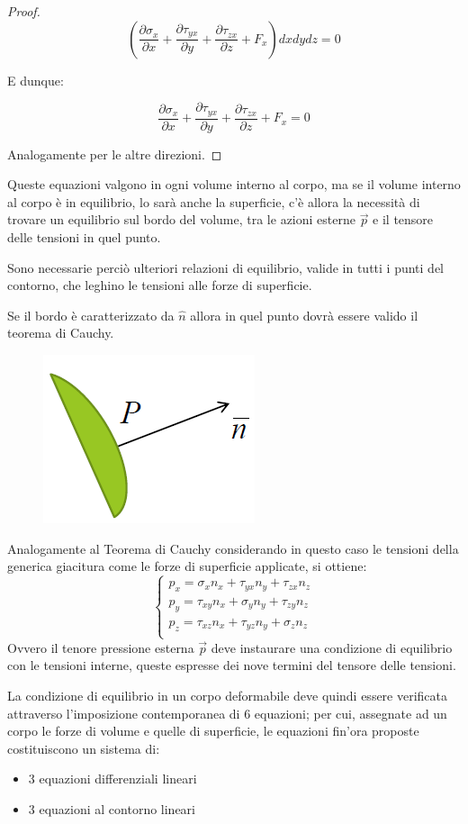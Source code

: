\documentclass{article}
\begin{document}
\begin{adjustwidth}{2in}{}
\begin{proof}
	\[
	\left( \frac{\partial \sigma_x}{\partial x} +  \frac{\partial \tau_{yx}}{\partial y} + \frac{\partial \tau_{zx}}{\partial z} + F_x \right) dxdydz = 0 
	\]
	
	E dunque: 
	
	\[
	\frac{\partial \sigma_x}{\partial x} +  \frac{\partial \tau_{yx}}{\partial y} + \frac{\partial \tau_{zx}}{\partial z} + F_x = 0	
	\]
	
	Analogamente per le altre direzioni.
	
	\end{proof}

	Queste equazioni valgono in ogni volume interno al corpo, ma se il volume interno al corpo è in equilibrio, lo sarà anche la superficie, c'è allora la necessità di trovare un equilibrio sul bordo del volume, tra le azioni esterne $\vec{p}$ e il tensore delle tensioni in quel punto. \newline
	
	Sono necessarie perciò ulteriori relazioni di
	equilibrio, valide in tutti i punti del contorno, che leghino le tensioni alle forze di
	superficie. \newline 
	
	Se il bordo è caratterizzato da $\hat{n}$ allora in quel punto dovrà essere valido il teorema di Cauchy. 

\begin{figure}[H]
	\centering
	\includegraphics[width=0.15\linewidth]{immagini/Screenshot (86)}
\end{figure}
	Analogamente al Teorema di Cauchy considerando in questo caso le tensioni della generica giacitura come le forze di superficie applicate, si ottiene:
	 \[
	\begin{cases}
		p_x = \sigma_x n_x + \tau_{yx}n_y + \tau_{zx}n_z \\
		p_y = \tau_{xy}n_x + \sigma_y n_y + \tau_{zy}n_z \\
		p_z = \tau_{xz}n_x + \tau_{yz}n_y + \sigma_z n_z \\
	\end{cases}
	\]
	Ovvero il tenore pressione esterna $\vec{p}$ deve instaurare una condizione di equilibrio con le tensioni interne, queste espresse dei nove termini del tensore delle tensioni. \newline
	
	La condizione di equilibrio in un corpo deformabile deve quindi essere verificata attraverso l'imposizione contemporanea di 6 equazioni; per cui, assegnate ad un corpo le forze di volume e quelle di superficie, le equazioni fin'ora proposte
	 costituiscono un sistema di:
	 \begin{itemize}
	 	\item 	3 equazioni differenziali lineari
	 	\item  	3 equazioni al contorno lineari
	 \end{itemize}
	

\end{adjustwidth}
\end{document}
